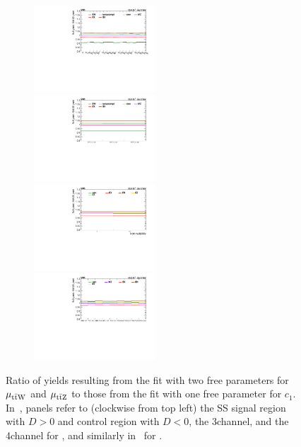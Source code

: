 \begin{figure}
\begin{subfigure}{\linewidth}
    \includegraphics[width=0.5\textwidth]{figures/thirteen-TeV/postfit/ratio_2l_cuB}%
    \includegraphics[width=0.5\textwidth]{figures/thirteen-TeV/postfit/ratio_2l-cr_cuB}
    \includegraphics[width=0.5\textwidth]{figures/thirteen-TeV/postfit/ratio_4l_cuB}%
    \includegraphics[width=0.5\textwidth]{figures/thirteen-TeV/postfit/ratio_3l_cuB}
    \caption{}
    \label{sfig:ratio-cuB}
  \end{subfigure}
  \caption[Ratio of two and one-dimensional fit yields for \ctwoG and \cuB (\thirteenTeV)]{Ratio of yields resulting from the fit with two free parameters for $\mu_{\text{t}\bar{\text{t}}\text{W}}$ and $\mu_{\text{t}\bar{\text{t}}\text{Z}}$ to those from the fit with one free parameter for $c_1$. In~, panels refer to (clockwise from top left) the SS \ttW signal region with $D > 0$ and control region with $D < 0$, the 3\lep \ttZ channel, and the 4\lep \ttZ channel for \ctwoG, and similarly in~ for \cuB.}
  \label{fig:ratio-c2G-cuB}
\end{figure}
